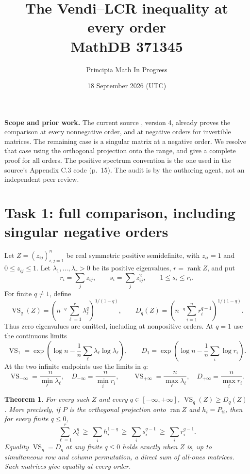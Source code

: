 \documentclass[11pt]{article}
\title{The Vendi--LCR inequality at every order\\MathDB 371345}
\author{Principia Math In Progress}
\date{18 September 2026 (UTC)}
\newtheorem{theorem}{Theorem}
\newcommand{\VS}{\operatorname{VS}}
\begin{document}
\maketitle
\noindent\textbf{Scope and prior work.} The current source \cite{N}, version 4,
already proves the comparison at every nonnegative order, and at negative
orders for invertible matrices. The remaining case is a singular matrix at
a negative order. We resolve that case using the orthogonal projection onto
the range, and give a complete proof for all orders. The positive spectrum
convention is the one used in the source's Appendix C.3 code (p.~15).
The audit is by the authoring agent, not an independent peer review.

\section*{Task 1: full comparison, including singular negative orders}
Let $Z=(z_{ij})_{i,j=1}^n$ be real symmetric positive semidefinite, with
$z_{ii}=1$ and $0\leq z_{ij}\leq1$. Let $\lambda_1,\ldots,\lambda_r>0$
be its positive eigenvalues, $r=\operatorname{rank}Z$, and put
\[
 r_i=\sum_j z_{ij},\qquad s_i=\sum_jz_{ij}^2,
 \qquad 1\leq s_i\leq r_i.
\]
For finite $q\ne1$, define
\[
 \VS_q(Z)=\left(n^{-q}\sum_{\ell=1}^r\lambda_\ell^q\right)^{1/(1-q)},
 \qquad
 D_q(Z)=\left(n^{-q}\sum_{i=1}^n r_i^{q-1}\right)^{1/(1-q)}.
\]
Thus zero eigenvalues are omitted, including at nonpositive orders.
At $q=1$ use the continuous limits
\[
 \VS_1=\exp\left(\log n-\frac1n\sum_\ell\lambda_\ell\log\lambda_\ell\right),
 \qquad D_1=\exp\left(\log n-\frac1n\sum_i\log r_i\right).
\]
At the two infinite endpoints use the limits in $q$:
\[
 \VS_{-\infty}=\frac n{\min_\ell\lambda_\ell},\quad
 D_{-\infty}=\frac n{\min_i r_i},\qquad
 \VS_{+\infty}=\frac n{\max_\ell\lambda_\ell},\quad
 D_{+\infty}=\frac n{\max_i r_i}.
\]

\begin{theorem}\label{thm:main}
For every such $Z$ and every $q\in[-\infty,+\infty]$,
$\VS_q(Z)\geq D_q(Z)$.
More precisely, if $P$ is the orthogonal projection onto $\operatorname{ran}Z$
and $h_i=P_{ii}$, then for every finite $q\leq0$,
\begin{equation}\label{eq:chain}
 \sum_{\ell=1}^r\lambda_\ell^q
 \ \geq\ \sum_i h_i^{1-q}
 \ \geq\ \sum_i s_i^{q-1}
 \ \geq\ \sum_i r_i^{q-1}.
\end{equation}
Equality $\VS_q=D_q$ at any finite $q\leq0$ holds exactly when $Z$ is,
up to simultaneous row and column permutation, a direct sum of all-ones
matrices. Such matrices give equality at every order.
\end{theorem}
\end{document}
